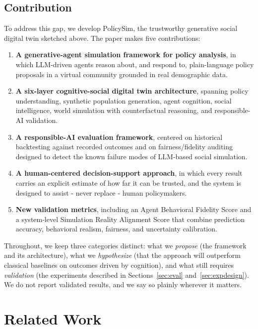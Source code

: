 \documentclass[conference]{IEEEtran}
\begin{document}
\subsection{Contribution}
To address this gap, we develop PolicySim, the trustworthy generative social digital twin sketched above. The paper makes five contributions:
\begin{enumerate}
\item \textbf{A generative-agent simulation framework for policy analysis}, in which LLM-driven agents reason about, and respond to, plain-language policy proposals in a virtual community grounded in real demographic data.
\item \textbf{A six-layer cognitive-social digital twin architecture}, spanning policy understanding, synthetic population generation, agent cognition, social intelligence, world simulation with counterfactual reasoning, and responsible-AI validation.
\item \textbf{A responsible-AI evaluation framework}, centered on historical backtesting against recorded outcomes and on fairness/fidelity auditing designed to detect the known failure modes of LLM-based social simulation.
\item \textbf{A human-centered decision-support approach}, in which every result carries an explicit estimate of how far it can be trusted, and the system is designed to assist - never replace - human policymakers.
\item \textbf{New validation metrics}, including an Agent Behavioral Fidelity Score and a system-level Simulation Reality Alignment Score that combine prediction accuracy, behavioral realism, fairness, and uncertainty calibration.
\end{enumerate}
Throughout, we keep three categories distinct: what we \emph{propose} (the framework and its architecture), what we \emph{hypothesize} (that the approach will outperform classical baselines on outcomes driven by cognition), and what still requires \emph{validation} (the experiments described in Sections~\ref{sec:eval} and~\ref{sec:expdesign}). We do not report validated results, and we say so plainly wherever it matters.

\section{Related Work}
\end{document}

